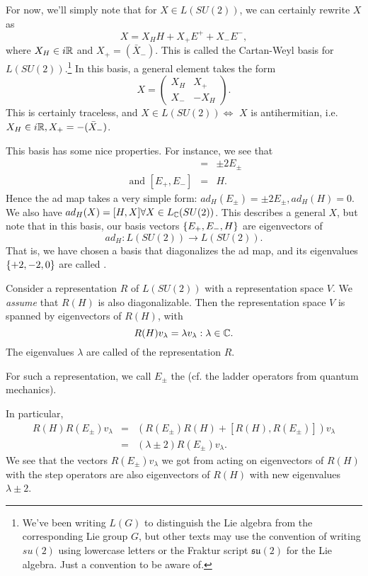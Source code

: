For now, we'll simply note that for $X\in L(SU(2))$, we can certainly rewrite $X$ as
$$X=X_H H + X_+ E^++ X_- E^-,$$
where $X_H\in i\mathbb{R}$ and $X_+=(\bar X_-).$ This is called the Cartan-Weyl basis for $L(SU(2))$.\footnote{We've been writing $L(G)$ to distinguish the Lie algebra from the corresponding Lie group $G$, but other texts may use the convention of writing $su(2)$ using lowercase letters or the Fraktur script $\mathfrak{su}(2)$ for the Lie algebra. Just a convention to be aware of.}
In this basis, a general element takes the form
$$X=\begin{pmatrix}
X_H & X_+\\
X_-&-X_H
\end{pmatrix}.$$
This is certainly traceless, and $X\in L(SU(2))\iff$ $X$ is antihermitian, i.e. $X_H\in i\mathbb{R}, X_+ = -(\bar X_-)$.

This basis has some nice properties. For instance, we see that
\begin{eqnarray*}
[H,E_\pm] &=& \pm 2 E_\pm\\
\text{ and } [E_+,E_-] &=& H.
\end{eqnarray*}
Hence the ad map takes a very simple form:
$ad_H(E_\pm)=\pm 2 E_\pm, ad_H(H)=0.$
We also have $ad_H(X)=[H,X]\forall X \in L_{\mathbb{C}}(SU(2))$. This describes a general $X$, but note that in this basis, our basis vectors $\{E_+,E_-,H\}$ are eigenvectors of
$$ad_H:L(SU(2))\to L(SU(2)).$$
That is, we have chosen a basis that diagonalizes the ad map, and its eigenvalues $\{+2,-2,0\}$ are called .

\begin{defn}
Consider a representation $R$ of $L(SU(2))$ with a representation space $V$. We \emph{assume} that $R(H)$ is also diagonalizable. Then the representation space $V$ is spanned by eigenvectors of $R(H)$, with
$$R(H)v_\lambda = \lambda v_\lambda: \lambda \in \mathbb{C}.$$
The eigenvalues $\lambda$ are called  of the representation $R$.
\end{defn}
\begin{defn}
For such a representation, we call $E_\pm$ the  (cf. the ladder operators from quantum mechanics).
\end{defn}
In particular,
\begin{eqnarray*}
R(H)R(E_\pm)v_\lambda &=& (R(E_\pm)R(H) + [R(H),R(E_\pm)]) v_\lambda\\
&=&(\lambda \pm 2) R(E_\pm)v_\lambda.
\end{eqnarray*}
We see that the vectors $R(E_\pm)v_\lambda$ we got from acting on eigenvectors of $R(H)$ with the step operators are also eigenvectors of $R(H)$ with new eigenvalues $\lambda \pm 2$.

